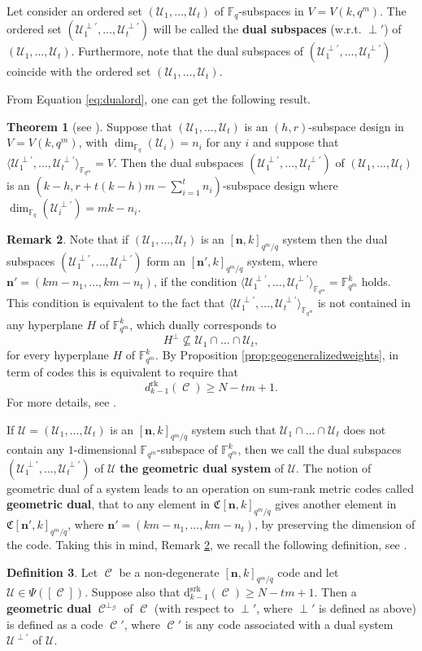 \documentclass[11pt]{amsart}
\DeclareMathOperator{\C}{\mathcal{C}}
\theoremstyle{definition}
\newtheorem{theorem}{Theorem}[section]
\newtheorem{definition}[theorem]{Definition}
\newtheorem{remark}[theorem]{Remark}
\newcommand{\F}{{\mathbb F}}
\newcommand{\U}{{\mathcal{U}}}
\newcommand{\bfn}{\mathbf {n}}
\newcommand{\fq}{{\mathbb F}_{q}}
\newcommand{\Fmnk}{[\bfn,k]_{q^m/q}}
\begin{document}
{Let consider an ordered set $(\U_1,\ldots,\U_t)$ of $\F_q$-subspaces in $V=V(k,q^m)$.
The ordered set $(\U_1^{\perp'},\ldots,\U_t^{\perp'})$ will be called the \textbf{dual subspaces} (w.r.t. $\perp'$) of $(\U_1,\ldots,\U_t)$.
Furthermore, note that the dual subspaces of $(\U_1^{\perp'},\ldots,\U_t^{\perp'})$ coincide with the ordered set $(\U_1,\ldots,\U_t)$.

From Equation \eqref{eq:dualord}, one can get the following result.

\begin{theorem} [see \textnormal{\cite[Theorem 7.1]{santonastaso2022subspace}}] \label{th:orddual}
Suppose that $(\U_1,\ldots,\U_t)$ is an $(h,r)$-subspace design in $V=V(k,q^m)$, with $\dim_{\fq} (\U_i) =n_i$ for any $i$ and suppose that $\langle \U_1^{\perp'},\ldots,\U_t^{\perp'}\rangle_{\F_{q^m}}=V$.
Then the dual subspaces $(\U_1^{\perp'},\ldots,\U_t^{\perp'})$ of $(\U_1,\ldots,\U_t)$ is an $(k-h,r+t(k-h)m-\sum_{i=1}^t n_i)$-subspace design where $\dim_{\fq} (\U_i^{\perp'})=mk-n_i$. 
\end{theorem}


\begin{remark} \label{rk:geogenrank}
Note that if $(\U_1,\ldots,\U_t)$ is an $\Fmnk$ system then the dual subspaces $(\U_1^{\perp'},\ldots,\U_t^{\perp'})$ form an $[\bfn',k]_{q^m/q}$ system, where $\bfn'=(km-n_1,\ldots,km-n_t)$, if the condition $\langle \U_1^{\perp'},\ldots,\U_t^{\perp'}\rangle_{\F_{q^m}}=\F_{q^m}^k$ holds.
This condition is equivalent to the fact that $\langle \U_1^{\perp'},\ldots,\U_t^{\perp'}\rangle_{\F_{q^m}}$ is not contained in any hyperplane $H$ of $\F_{q^m}^k$, which dually corresponds to 
\[
H^{\perp} \not \subseteq \U_1 \cap \ldots \cap  \U_t,
\]
for every hyperplane $H$ of $\F_{q^m}^k$.
By Proposition \ref{prop:geogeneralizedweights}, in term of codes this is equivalent to require that \[d_{k-1}^{\mathrm{rk}}(\C)\geq N-tm+1.\]
For more details, see \cite[Remark 3.3]{borello2023geometric}.
\end{remark}

If $\U=(\U_1,\ldots,\U_t)$ is an $\Fmnk$ system such that $\U_1 \cap \ldots \cap \U_t $ does not contain any $1$-dimensional $\F_{q^m}$-subspace of $\F_{q^m}^k$, then we call the dual subspaces $(\U_1^{\perp'},\ldots,\U_t^{\perp'})$ of $\U$ \textbf{the geometric dual system} of $\U$.
The notion of geometric dual of a system leads to an operation on sum-rank metric codes called \textbf{geometric dual}, that to any element in $\mathfrak{C}[\bfn,k]_{q^m/q}$ gives another element in $\mathfrak{C}[\bfn',k]_{q^m/q}$, where $\bfn'=(km-n_1,\ldots,km-n_t)$, by preserving the dimension of the code. Taking this in mind, Remark \ref{rk:geogenrank}, we recall the following definition, see \cite{borello2023geometric}.
\begin{definition}
Let $\C$ be a non-degenerate $\Fmnk$ code and let $\U \in \Psi([\C])$.
Suppose also that $\mathrm{d}^{\mathrm{srk}}_{k-1} (\C)\geq N-tm+1$. Then a \textbf{geometric dual} $\C^{\perp_{\mathcal{G}}}$ of $\C$ (with respect to $\perp'$, where $\perp'$ is defined as above) is defined as a code $\C'$, where $\C'$ is any code associated with a dual system $\U^{\perp'}$ of $\U$.
\end{definition}

}
\end{document}
